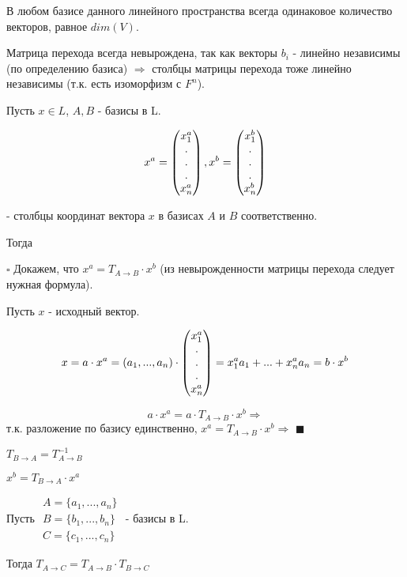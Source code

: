 \documentclass[../main.tex]{subfiles}
\begin{document}
\void{} В любом базисе данного линейного пространства всегда одинаковое
количество векторов, равное $dim(V)$.

\void{} Матрица перехода всегда невырождена, так как векторы $b_i$ - линейно независимы
(по определению базиса) $\Rightarrow$ столбцы матрицы перехода тоже линейно независимы
(т.к. есть изоморфизм с $F^n$).

\void{} Пусть $x\in L$, $A, B$ - базисы в L.

$$x^a = \begin{pmatrix} x^a_1\\.\\.\\.\\x^a_n\end{pmatrix}, x^b = \begin{pmatrix} x^b_1\\.\\.\\.\\x^b_n\end{pmatrix}$$

- столбцы координат вектора $x$ в базисах $A$ и $B$ соответственно.

Тогда 

\void
$\square$ Докажем, что $x^a = T_{A\rightarrow B}\cdot x^b$ (из невырожденности матрицы перехода следует нужная формула).

Пусть $x$ - исходный вектор.

$$ x = a\cdot x^a = (a_1,...,a_n)\cdot \begin{pmatrix} x^a_1\\.\\.\\.\\x^a_n\end{pmatrix} = x^a_1a_1 + ... + x^a_na_n = b\cdot x^b$$

$$ a\cdot x^a = a\cdot T_{A\rightarrow B}\cdot x^b \Longrightarrow$$
т.к. разложение по базису единственно, $x^a = T_{A\rightarrow B}\cdot x^b \Longrightarrow$
 $\blacksquare$

\void{} $T_{B\rightarrow A} = T^{-1}_{A\rightarrow B}$

\void{} $x^b = T_{B\rightarrow A}\cdot x^a$

\void{} Пусть $\begin{matrix} A = \{a_1,...,a_n\} \\ B = \{b_1,...,b_n\} \\ C = \{c_1,...,c_n\}\end{matrix}$ - базисы в L.

Тогда $T_{A\rightarrow C} = T_{A\rightarrow B}\cdot T_{B\rightarrow C}$
\end{document}
